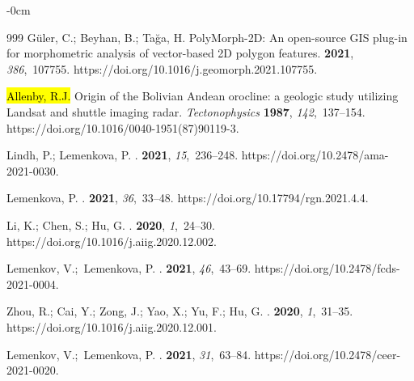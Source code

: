 \documentclass[data,article,accept,pdftex,moreauthors]{Definitions/mdpi}
\begin{document}
{\begin{adjustwidth}{-\extralength}{0cm}
\begin{thebibliography}{999}
Güler, C.; Beyhan, B.; Tağa, H.
\newblock PolyMorph-2D: An open-source GIS plug-in for morphometric analysis of
 vector-based 2D polygon features.
 {\bf 2021}, {\em 386},~107755.
https://doi.org/10.1016/j.geomorph.2021.107755.

\hl{Allenby, R.J.}%
 Origin of the Bolivian Andean orocline: a geologic study utilizing Landsat and shuttle imaging radar. {\em Tectonophysics} {\bf 1987}, {\em 142},~137--154. https://doi.org/10.1016/0040-1951(87)90119-3.


Lindh, P.; Lemenkova, P.
.
 {\bf 2021}, {\em 15},~236--248.
https://doi.org/10.2478/ama-2021-0030.

Lemenkova, P.
.
 {\bf 2021}, {\em 36},~33--48.
https://doi.org/10.17794/rgn.2021.4.4.

Li, K.; Chen, S.; Hu, G.
.
 {\bf 2020}, {\em
 1},~24--30.
https://doi.org/10.1016/j.aiig.2020.12.002.

Lemenkov, V.;~Lemenkova, P.
.
 {\bf 2021}, {\em
 46},~43--69.
https://doi.org/10.2478/fcds-2021-0004.

Zhou, R.; Cai, Y.; Zong, J.; Yao, X.; Yu, F.; Hu, G.
.
 {\bf 2020}, {\em
 1},~31--35.
https://doi.org/10.1016/j.aiig.2020.12.001.

Lemenkov, V.;~Lemenkova, P.
.
 {\bf 2021}, {\em
 31},~63--84.
https://doi.org/10.2478/ceer-2021-0020.


\end{thebibliography}
\end{adjustwidth}}
\end{document}
